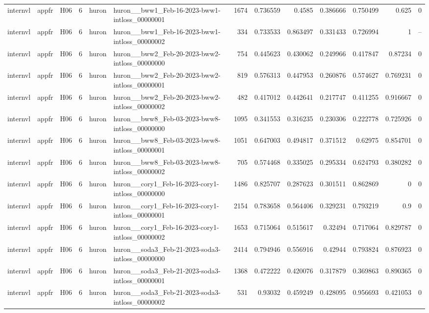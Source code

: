 \begin{longtable}{lllrllrrrrrrr}
internvl & appfr & H06 & 6 & huron & huron\_\_bww1\_Feb-16-2023-bww1-intloss\_00000001 & 1674 & 0.736559 & 0.4585 & 0.386666 & 0.750499 & 0.625 & 0 \\
internvl & appfr & H06 & 6 & huron & huron\_\_bww1\_Feb-16-2023-bww1-intloss\_00000002 & 334 & 0.733533 & 0.863497 & 0.331433 & 0.726994 & 1 & -- \\
internvl & appfr & H06 & 6 & huron & huron\_\_bww2\_Feb-20-2023-bww2-intloss\_00000000 & 754 & 0.445623 & 0.430062 & 0.249966 & 0.417847 & 0.87234 & 0 \\
internvl & appfr & H06 & 6 & huron & huron\_\_bww2\_Feb-20-2023-bww2-intloss\_00000001 & 819 & 0.576313 & 0.447953 & 0.260876 & 0.574627 & 0.769231 & 0 \\
internvl & appfr & H06 & 6 & huron & huron\_\_bww2\_Feb-20-2023-bww2-intloss\_00000002 & 482 & 0.417012 & 0.442641 & 0.217747 & 0.411255 & 0.916667 & 0 \\
internvl & appfr & H06 & 6 & huron & huron\_\_bww8\_Feb-03-2023-bww8-intloss\_00000000 & 1095 & 0.341553 & 0.316235 & 0.230306 & 0.222778 & 0.725926 & 0 \\
internvl & appfr & H06 & 6 & huron & huron\_\_bww8\_Feb-03-2023-bww8-intloss\_00000001 & 1051 & 0.647003 & 0.494817 & 0.371512 & 0.62975 & 0.854701 & 0 \\
internvl & appfr & H06 & 6 & huron & huron\_\_bww8\_Feb-03-2023-bww8-intloss\_00000002 & 705 & 0.574468 & 0.335025 & 0.295334 & 0.624793 & 0.380282 & 0 \\
internvl & appfr & H06 & 6 & huron & huron\_\_cory1\_Feb-16-2023-cory1-intloss\_00000000 & 1486 & 0.825707 & 0.287623 & 0.301511 & 0.862869 & 0 & 0 \\
internvl & appfr & H06 & 6 & huron & huron\_\_cory1\_Feb-16-2023-cory1-intloss\_00000001 & 2154 & 0.783658 & 0.564406 & 0.329231 & 0.793219 & 0.9 & 0 \\
internvl & appfr & H06 & 6 & huron & huron\_\_cory1\_Feb-16-2023-cory1-intloss\_00000002 & 1653 & 0.715064 & 0.515617 & 0.32494 & 0.717064 & 0.829787 & 0 \\
internvl & appfr & H06 & 6 & huron & huron\_\_soda3\_Feb-21-2023-soda3-intloss\_00000000 & 2414 & 0.794946 & 0.556916 & 0.42944 & 0.793824 & 0.876923 & 0 \\
internvl & appfr & H06 & 6 & huron & huron\_\_soda3\_Feb-21-2023-soda3-intloss\_00000001 & 1368 & 0.472222 & 0.420076 & 0.317879 & 0.369863 & 0.890365 & 0 \\
internvl & appfr & H06 & 6 & huron & huron\_\_soda3\_Feb-21-2023-soda3-intloss\_00000002 & 531 & 0.93032 & 0.459249 & 0.428095 & 0.956693 & 0.421053 & 0 \\

\end{longtable}
